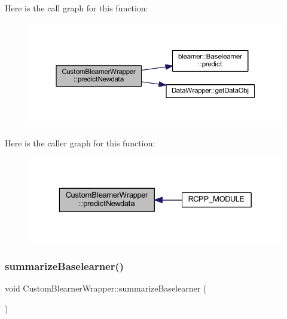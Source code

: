 Here is the call graph for this function\+:\nopagebreak
\begin{figure}[H]
\begin{center}
\leavevmode
\includegraphics[width=350pt]{class_custom_blearner_wrapper_a0aba49ca5396f5bd09a745003436dd3f_cgraph}
\end{center}
\end{figure}
Here is the caller graph for this function\+:\nopagebreak
\begin{figure}[H]
\begin{center}
\leavevmode
\includegraphics[width=329pt]{class_custom_blearner_wrapper_a0aba49ca5396f5bd09a745003436dd3f_icgraph}
\end{center}
\end{figure}
\mbox{\label{class_custom_blearner_wrapper_a61e82d619f07ba3e69fa4100be0ed1f2}} 
\subsubsection{\texorpdfstring{summarize\+Baselearner()}{summarizeBaselearner()}}
{\footnotesize\ttfamily void Custom\+Blearner\+Wrapper\+::summarize\+Baselearner (\begin{DoxyParamCaption}{ }\end{DoxyParamCaption})\hspace{0.3cm}{\ttfamily [inline]}}

